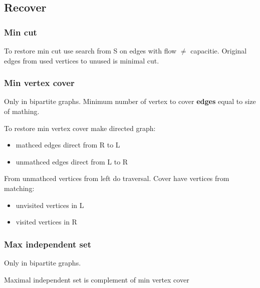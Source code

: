 \subsection{Recover}
\subsubsection{Min cut}
To restore min cut use search from S on edges with flow $\ne$ capacitie. 
Original edges from used vertices to unused is minimal cut.


\subsubsection{Min vertex cover}
Only in bipartite graphs.
Minimum number of vertex to cover \textbf{edges} equal to size of mathing.

To restore min vertex cover make directed graph:
\begin{itemize}
\item mathced edges direct from R to L
\item unmathced edges direct from L to R
\end{itemize}

From unmathced vertices from left do traversal.
Cover have vertices from matching:
\begin{itemize}
\item unvisited vertices in L 
\item visited vertices in R
\end{itemize}

\subsubsection{Max independent set}
Only in bipartite graphs.

Maximal independent set is complement of min vertex cover

